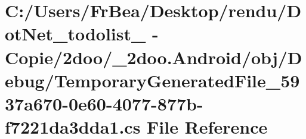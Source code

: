 \hypertarget{_android_2obj_2_debug_2_temporary_generated_file__5937a670-0e60-4077-877b-f7221da3dda1_8cs}{
\section{C:/Users/FrBea/Desktop/rendu/DotNet\_\-todolist\_ - Copie/2doo/\_\-2doo.Android/obj/Debug/TemporaryGeneratedFile\_\-5937a670-0e60-4077-877b-f7221da3dda1.cs File Reference}
\label{_android_2obj_2_debug_2_temporary_generated_file__5937a670-0e60-4077-877b-f7221da3dda1_8cs}
}
